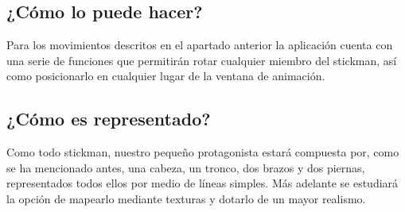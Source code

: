 \documentclass[a4paper,12pt]{article}
\begin{document}
    \subsection{¿Cómo lo puede hacer?}
    Para los movimientos descritos en el apartado anterior la aplicación cuenta con una serie de funciones que permitirán rotar cualquier miembro del
    stickman, así como posicionarlo en cualquier lugar de la ventana de animación.\\
    
    \subsection{¿Cómo es representado?}
    Como todo stickman, nuestro pequeño protagonista estará compuesta por, como se ha mencionado antes, una cabeza, un tronco, dos brazos y dos piernas,
    representados todos ellos por medio de líneas simples. Más adelante se estudiará la opción de mapearlo mediante texturas y dotarlo de un mayor
    realismo.\\
  
\end{document}
